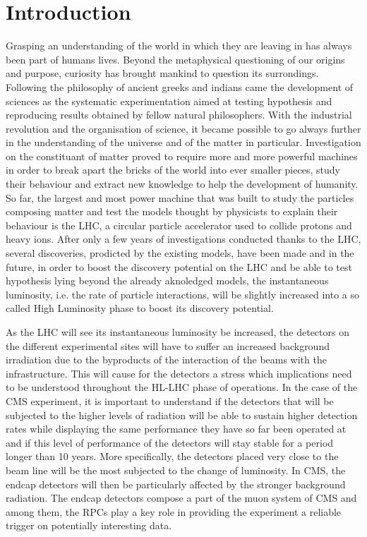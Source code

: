 \renewcommand\evenpagerightmark{{\scshape\small Chapter 1}}
\renewcommand\oddpageleftmark{{\scshape\small Introduction}}

\renewcommand{\bibname}{References}

\hyphenation{}

\chapter[Introduction]%
{Introduction}
\label{chap:intro}

Grasping an understanding of the world in which they are leaving in has always been part of humans lives. Beyond the metaphysical questioning of our origins and purpose, curiosity has brought mankind to question its surrondings. Following the philosophy of ancient greeks and indians came the development of sciences as the systematic experimentation aimed at testing hypothesis and reproducing results obtained by fellow natural philosophers. With the industrial revolution and the organisation of science, it became possible to go always further in the understanding of the universe and of the matter in particular. Investigation on the constituant of matter proved to require more and more powerful machines in order to break apart the bricks of the world into ever smaller pieces, study their behaviour and extract new knowledge to help the development of humanity. So far, the largest and most power machine that was built to study the particles composing matter and test the models thought by physicists to explain their behaviour is the \acf{LHC}, a circular particle accelerator used to collide protons and heavy ions. After only a few years of investigations conducted thanks to the LHC, several discoveries, prodicted by the existing models, have been made and in the future, in order to boost the discovery potential on the LHC and be able to test hypothesis lying beyond the already aknoledged models, the instantaneous luminosity, i.e. the rate of particle interactions, will be slightly increased into a so called High Luminosity phase to boost its discovery potential.

As the \acl{LHC} will see its instantaneous luminosity be increased, the detectors on the different experimental sites will have to suffer an increased background irradiation due to the byproducts of the interaction of the beams with the infrastructure. This will cause for the detectors a stress which implications need to be understood throughout the \acf{HL-LHC} phase of operations. In the case of the \acf{CMS} experiment, it is important to understand if the detectors that will be subjected to the higher levels of radiation will be able to sustain higher detection rates while displaying the same performance they have so far been operated at and if this level of performance of the detectors will stay stable for a period longer than 10 years. More specifically, the detectors placed very close to the beam line will be the most subjected to the change of luminosity. In CMS, the endcap detectors will then be particularly affected by the stronger background radiation. The endcap detectors compose a part of the muon system of CMS and among them, the \acf{RPC}s play a key role in providing the experiment a reliable trigger on potentially interesting data.

